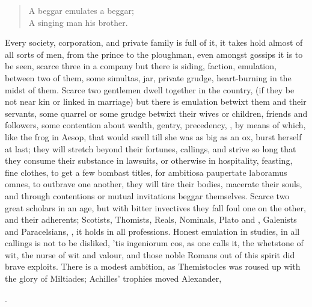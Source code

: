 {\begin{verse}
A beggar emulates a beggar;\\
A singing man his brother.\\
\end{verse}
%
Every society, corporation, and private family is full of it, it takes
hold almost of all sorts of men, from the prince to the ploughman, even
amongst gossips it is to be seen, scarce three in a company but there
is siding, faction, emulation, between two of them, some simultas, jar,
private grudge, heart-burning in the midst of them. Scarce two
gentlemen dwell together in the country, (if they be not near kin or
linked in marriage) but there is emulation betwixt them and their
servants, some quarrel or some grudge betwixt their wives or children,
friends and followers, some contention about wealth, gentry,
precedency, \etc{}, by means of which, like the frog in Aesop, that
would swell till she was as big as an ox, burst herself at last; they
will stretch beyond their fortunes, callings, and strive so long that
they consume their substance in lawsuits, or otherwise in hospitality,
feasting, fine clothes, to get a few bombast titles, for ambitiosa
paupertate laboramus omnes, to outbrave one another, they will tire
their bodies, macerate their souls, and through contentions or mutual
invitations beggar themselves. Scarce two great scholars in an age, but
with bitter invectives they fall foul one on the other, and their
adherents; Scotists, Thomists, Reals, Nominals, Plato and \Aristotle,
Galenists and Paracelsians, \etc{}, it holds in all professions.
Honest emulation in studies, in all callings is not to be
disliked, 'tis ingeniorum cos, as one calls it, the whetstone of wit,
the nurse of wit and valour, and those noble Romans out of this spirit
did brave exploits. There is a modest ambition, as Themistocles was
roused up with the glory of Miltiades; Achilles' trophies moved
Alexander,

.

}
